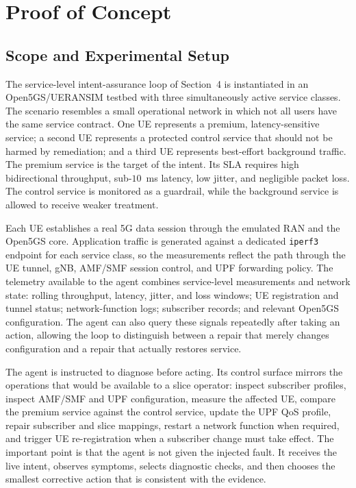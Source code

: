 \section{Proof of Concept}
\label{sec:proof-of-concept}

\subsection{Scope and Experimental Setup}
\label{subsec:poc-setup}

The service-level intent-assurance loop of Section~4 is instantiated in an
Open5GS/UERANSIM testbed with three simultaneously active service classes. The
scenario resembles a small operational network in which not all users have the
same service contract. One UE represents a premium, latency-sensitive service;
a second UE represents a protected control service that should not be harmed by
remediation; and a third UE represents best-effort background traffic. The
premium service is the target of the intent. Its SLA requires high bidirectional
throughput, sub-$10$~ms latency, low jitter, and negligible packet loss. The
control service is monitored as a guardrail, while the background service is
allowed to receive weaker treatment.

Each UE establishes a real 5G data session through the emulated RAN and the
Open5GS core. Application traffic is generated against a dedicated
\texttt{iperf3} endpoint for each service class, so the measurements reflect
the path through the UE tunnel, gNB, AMF/SMF session control, and UPF
forwarding policy. The telemetry available to the agent combines service-level
measurements and network state: rolling throughput, latency, jitter, and loss
windows; UE registration and tunnel status; network-function logs; subscriber
records; and relevant Open5GS configuration. The agent can also query these
signals repeatedly after taking an action, allowing the loop to distinguish
between a repair that merely changes configuration and a repair that actually
restores service.

The agent is instructed to diagnose before acting. Its control surface mirrors
the operations that would be available to a slice operator: inspect subscriber
profiles, inspect AMF/SMF and UPF configuration, measure the affected UE,
compare the premium service against the control service, update the UPF QoS
profile, repair subscriber and slice mappings, restart a network function when
required, and trigger UE re-registration when a subscriber change must take
effect. The important point is that the agent is not given the injected fault.
It receives the live intent, observes symptoms, selects diagnostic checks, and
then chooses the smallest corrective action that is consistent with the
evidence.

